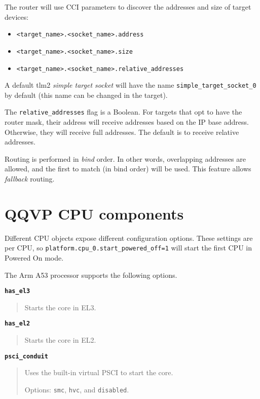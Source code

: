 The router will use CCI parameters to discover the addresses and size of target devices:

\begin{itemize}
\item {\small{\lstinline!<target_name>.<socket_name>.address!}}
\item {\small{\lstinline!<target_name>.<socket_name>.size!}}
\item {\small{\lstinline!<target_name>.<socket_name>.relative_addresses!}}
\end{itemize}

A default tlm2 \emph{simple target socket} will have the name {\small{\lstinline!simple_target_socket_0!}} by default (this name can be changed in the target).

The {\small{\lstinline!relative_addresses!}} flag is a Boolean. For targets that opt to have the router mask, their address will receive addresses based on the IP base address. Otherwise, they will receive full addresses. The default is to receive relative addresses.

\note Routing is performed in \emph{bind} order. In other words, overlapping addresses are allowed, and the first to match (in bind order) will be used. This feature allows \emph{fallback} routing.


\clearpage
\section{QQVP CPU components}

Different CPU objects expose different configuration options. These settings are per CPU, so {\small{\lstinline!platform.cpu_0.start_powered_off=1!}} will start the first CPU in Powered On mode.

The Arm A53 processor supports the following options.

{\textbf {\footnotesize{\lstinline!has_el3!}}}
\vspace{-2pt}
\begin{quote}
Starts the core in EL3.
\end{quote}


{\textbf {\footnotesize{\lstinline!has_el2!}}}
\vspace{-2pt}
\begin{quote}
Starts the core in EL2.
\end{quote}


{\textbf {\footnotesize{\lstinline!psci_conduit!}}}
\vspace{-2pt}
\begin{quote}
Uses the built-in virtual PSCI to start the core.

Options: {\small{\lstinline!smc!}}, {\small{\lstinline!hvc!}}, and {\small{\lstinline!disabled!}}.
\end{quote}


